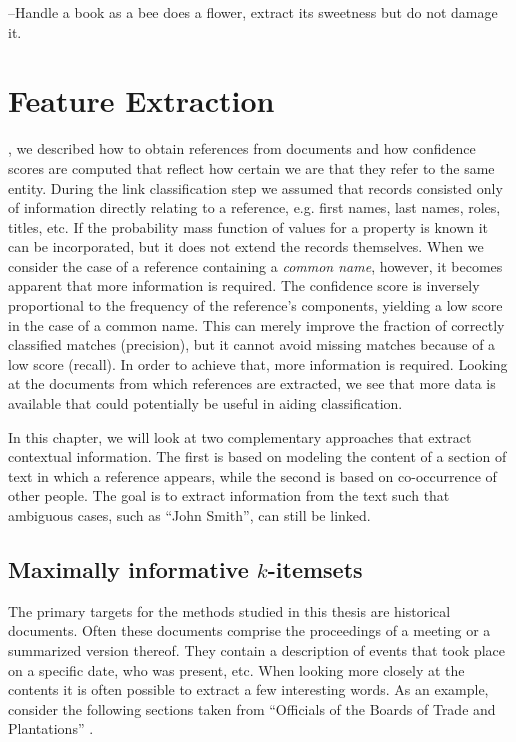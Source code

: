 \begin{savequote}[75mm] 
--Handle a book as a bee does a flower, extract its sweetness but do not damage it.
\end{savequote}




\chapter{Feature Extraction}
\label{ch:feature_extraction}

, we described how to obtain references from documents and how confidence scores are computed that reflect how certain we are that they refer to the same entity.
During the link classification step we assumed that records consisted only of information directly relating to a reference, e.g. first names, last names, roles, titles, etc.
If the probability mass function of values for a property is known it can be incorporated, but it does not extend the records themselves.
When we consider the case of a reference containing a \emph{common name}, however, it becomes apparent that more information is required.
The confidence score is inversely proportional to the frequency of the reference's components, yielding a low score in the case of a common name.
This can merely improve the fraction of correctly classified matches (precision), but it cannot avoid missing matches because of a low score (recall).
In order to achieve that, more information is required.
Looking at the documents from which references are extracted, we see that more data is available that could potentially be useful in aiding classification.

In this chapter, we will look at two complementary approaches that extract contextual information.
The first is based on modeling the content of a section of text in which a reference appears, while the second is based on co-occurrence of other people.
The goal is to extract information from the text such that ambiguous cases, such as ``John Smith'', can still be linked.




\section{Maximally informative $k$-itemsets}
\label{sec:miki}

The primary targets for the methods studied in this thesis are historical documents.
Often these documents comprise the proceedings of a meeting or a summarized version thereof.
They contain a description of events that took place on a specific date, who was present, etc.
When looking more closely at the contents it is often possible to extract a few interesting words.
As an example, consider the following sections taken from ``Officials of the Boards of Trade and Plantations'' \citep{TradePlantations}.

